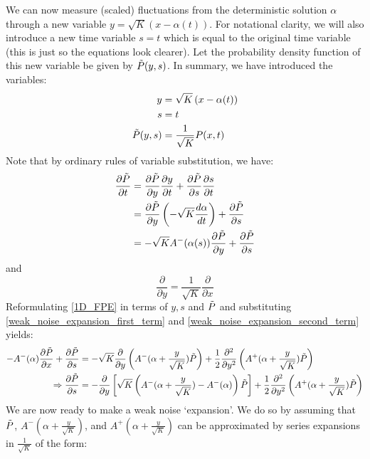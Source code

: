 We can now measure (scaled) fluctuations from the deterministic solution $\alpha$ through a new variable $y=\sqrt{K}\left(x-\alpha(t)\right)$. For notational clarity, we will also introduce a new time variable $s=t$ which is equal to the original time variable (this is just so the equations look clearer). Let the probability density function of this new variable be given by $\Tilde{P}(y,s)$. In summary, we have introduced the variables:
\begin{align*}
y &= \sqrt{K}\left(x-\alpha(t)\right)\\
s &= t\\
\Tilde{P}(y,s) &= \frac{1}{\sqrt{K}}P(x,t)
\end{align*}
Note that by ordinary rules of variable substitution, we have:
\begin{align}
\frac{\partial \Tilde{P}}{\partial t} &= \frac{\partial \Tilde{P}}{\partial y}\frac{\partial y}{\partial t} + \frac{\partial \Tilde{P}}{\partial s}\frac{\partial s}{\partial t}\nonumber\\
&=\frac{\partial \Tilde{P}}{\partial y}\left( -\sqrt{K}\frac{d\alpha}{dt}\right) + \frac{\partial \Tilde{P}}{\partial s}\nonumber\\
&= -\sqrt{K}A^{-}(\alpha(s))\frac{\partial \Tilde{P}}{\partial y} + \frac{\partial \Tilde{P}}{\partial s}\label{weak_noise_expansion_first_term}
\end{align}
and
\begin{equation}
\label{weak_noise_expansion_second_term}
\frac{\partial }{\partial y} = \frac{1}{\sqrt{K}}\frac{\partial }{\partial x}
\end{equation}
Reformulating \eqref{1D_FPE} in terms of $y,s$ and $\Tilde{P}$ and substituting \eqref{weak_noise_expansion_first_term} and \eqref{weak_noise_expansion_second_term} yields:
\begin{align}
-A^-(\alpha)\frac{\partial\Tilde{P}}{\partial x} + \frac{\partial \Tilde{P}}{\partial s} &= -\sqrt{K}\frac{\partial}{\partial y}\left(A^-(\alpha+\frac{y}{\sqrt{K}})\Tilde{P}\right)+\frac{1}{2}\frac{\partial^2}{\partial y^2}\left(A^+(\alpha+\frac{y}{\sqrt{K}})\Tilde{P}\right)\nonumber\\
\Rightarrow \frac{\partial \Tilde{P}}{\partial s} &= -\frac{\partial}{\partial y}\left[\sqrt{K}\left(A^-(\alpha+\frac{y}{\sqrt{K}})-A^-(\alpha)\right)\Tilde{P}\right]+\frac{1}{2}\frac{\partial^2}{\partial y^2}\left(A^+(\alpha+\frac{y}{\sqrt{K}})\Tilde{P}\right)\label{weak_noise_exact_equation}
\end{align}
We are now ready to make a weak noise `expansion'. We do so by assuming that $\Tilde{P}$, $A^-(\alpha + \frac{y}{\sqrt{K}})$, and $A^+(\alpha+\frac{y}{\sqrt{K}})$ can be approximated by series expansions in $\frac{1}{\sqrt{K}}$ of the form:
